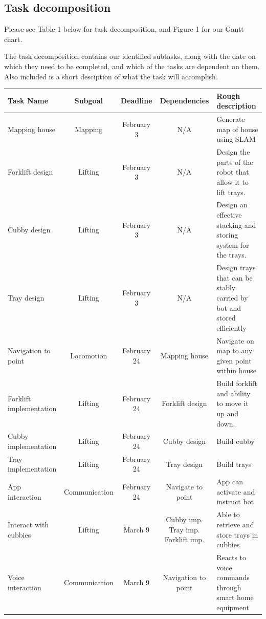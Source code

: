 \documentclass{article}
\begin{document}
\subsection{Task decomposition} 
Please see Table 1 below for task decomposition, and Figure 1 for our Gantt chart. 

The task decomposition contains our identified subtasks, along with the date on which they need to be completed, and which of the tasks are dependent on them. Also included is a short desciption of what the task will accomplish. 

\begin{table}[h]
\vskip 3mm
\begin{center}
\begin{small}
\begin{sc}
\begin{tabular}{lcccp{3cm}}
\hline
\abovespace\belowspace
Task Name & Subgoal  & Deadline & Dependencies &  Rough description \\
\hline
\hline
\abovespace
Mapping house & Mapping & February 3 & N/A & Generate map of house using SLAM \\ \hline
Forklift design & Lifting & February 3 & N/A & Design the parts of the robot that allow it to lift trays. \\ \hline
Cubby design & Lifting & February 3 & N/A & Design an effective stacking and storing system for the trays. \\ \hline
Tray design & Lifting & February 3 & N/A & Design trays that can be stably carried by bot and stored efficiently \\ \hline
Navigation to point & Locomotion & February 24 & Mapping house & Navigate on map to any given point within house \\ \hline
Forklift implementation & Lifting & February 24 & Forklift design & Build forklift and ability to move it up and down. \\ \hline
Cubby implementation & Lifting & February 24 & Cubby design & Build cubby \\ \hline
Tray implementation & Lifting & February 24 & Tray design & Build trays \\ \hline
App interaction & Communication & February 24 & Navigate to point & App can activate and instruct bot \\ \hline
Interact with cubbies & Lifting & March 9 & Cubby imp. Tray imp. Forklift imp. & Able to retrieve and store trays in cubbies \\ \hline
Voice interaction & Communication & March 9 & Navigation to point & Reacts to voice commands through smart home equipment \\ \hline

\end{tabular}
\end{sc}
\end{small}
\end{center}
\end{table}
\end{document}
